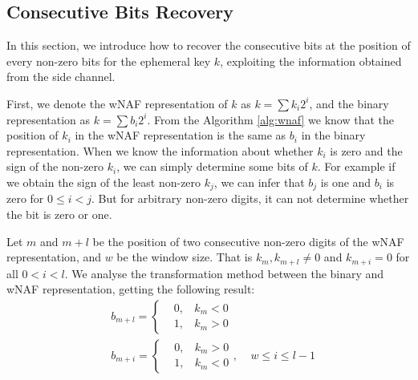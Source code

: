 






\subsection{Consecutive Bits Recovery}
\label{data_proc1}
In this section, we introduce how to recover the consecutive bits at the position of every non-zero bits for the ephemeral key $k$, exploiting the information obtained from the side channel.

First, we denote the wNAF representation of $k$ as $k = \sum{k_{i}2^{i}}$,
 and the binary representation as $k = \sum{b_{i}2^{i}}$.
From the Algorithm \ref{alg:wnaf} we know that the position of $k_i$ in the wNAF representation is the same as $b_i$ in the binary representation.
 When we know the information about whether $k_i$ is zero and the sign of the non-zero $k_i$, we can simply determine some bits of $k$.
 For example if we obtain the sign of the least non-zero $k_j$, we can infer that $b_j$ is one and $b_i$ is zero for $0\leq i<j$.
 But for arbitrary non-zero digits, it can not determine whether the bit is zero or one.

 Let $m$ and $m + l$ be the position of two consecutive non-zero digits of the wNAF representation, and $w$ be the window size.
 That is $k_m, k_{m+l} \neq 0$ and $k_{m+i} = 0$ for all $0 < i < l$.
 We analyse the transformation method between the binary and wNAF representation, getting the following result:
 \begin{align}
 &b_{m+l} = \left\{
 \begin{aligned}
 	&0,\,\;\ \   k_m < 0 \\
 	&1,\,\;\ \   k_m > 0
 \end{aligned}
 \right.   \\
 &b_{m+i} = \left\{
 \begin{aligned}
 	&0,\,\;\ \   k_m > 0 \\
 	&1,\,\;\ \   k_m < 0
 \end{aligned}
 \right.
 ,\ \ \ \ \  w \leq i \leq l-1
 \end{align}

